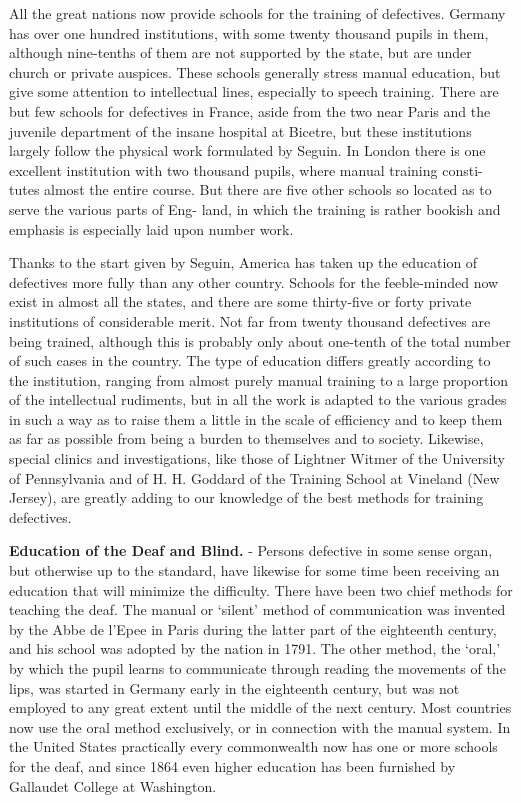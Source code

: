 \documentclass[]{book}
\begin{document}
All the great nations now provide schools for the training of defectives. Germany has over one hundred institutions, with some twenty thousand pupils in them, although nine-tenths of them are not supported by the state, but are under church or private auspices. These schools generally stress manual education, but give some attention to intellectual lines, especially to speech training. There are but few schools for defectives in France, aside from the two near Paris and the juvenile department of the insane hospital at Bicetre, but these institutions largely follow the physical work formulated by Seguin. In London there is one excellent institution with two thousand pupils, where manual training consti- tutes almost the entire course. But there are five other schools so located as to serve the various parts of Eng- land, in which the training is rather bookish and emphasis is especially laid upon number work.

Thanks to the start given by Seguin, America has taken up the education of defectives more fully than any other country. Schools for the feeble-minded now exist in almost all the states, and there are some thirty-five or forty private institutions of considerable merit. Not far from twenty thousand defectives are being trained, although this is probably only about one-tenth of the total number of such cases in the country. The type of education differs greatly according to the institution, ranging from almost purely manual training to a large proportion of the intellectual rudiments, but in all the work is adapted to the various grades in such a way as to raise them a little in the scale of efficiency and to keep them as far as possible from being a burden to themselves and to society. Likewise, special clinics and investigations, like those of Lightner Witmer of the University of Pennsylvania and of H. H. Goddard of the Training School at Vineland (New Jersey), are greatly adding to our knowledge of the best methods for training defectives.

\textbf{Education of the Deaf and Blind.} - Persons defective in some sense organ, but otherwise up to the standard, have likewise for some time been receiving an education that will minimize the difficulty. There have been two chief methods for teaching the deaf. The manual or `silent' method of communication was invented by the Abbe de l'Epee in Paris during the latter part of the eighteenth century, and his school was adopted by the nation in 1791. The other method, the `oral,' by which the pupil learns to communicate through reading the movements of the lips, was started in Germany early in the eighteenth century, but was not employed to any great extent until the middle of the next century. Most countries now use the oral method exclusively, or in connection with the manual system. In the United States practically every commonwealth now has one or more schools for the deaf, and since 1864 even higher education has been furnished by Gallaudet College at Washington.
\end{document}
